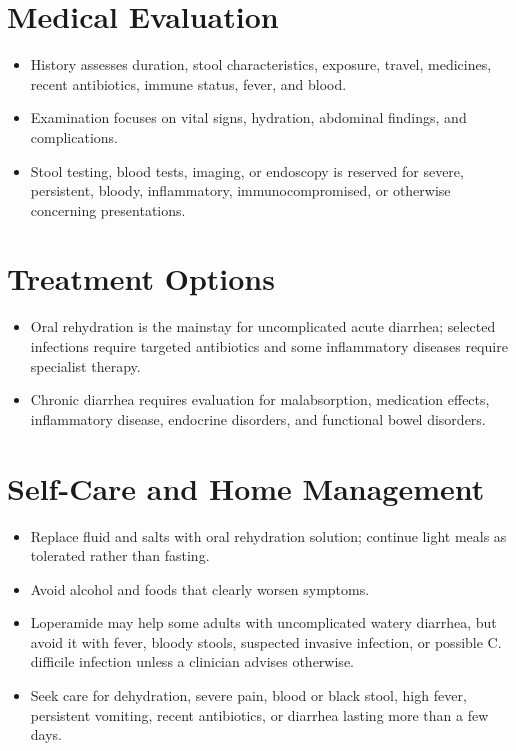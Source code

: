 \section*{Medical Evaluation}
\begin{itemize}
  \item History assesses duration, stool characteristics, exposure, travel, medicines, recent antibiotics, immune status, fever, and blood.
  \item Examination focuses on vital signs, hydration, abdominal findings, and complications.
  \item Stool testing, blood tests, imaging, or endoscopy is reserved for severe, persistent, bloody, inflammatory, immunocompromised, or otherwise concerning presentations.
\end{itemize}

\section*{Treatment Options}
\begin{itemize}
  \item Oral rehydration is the mainstay for uncomplicated acute diarrhea; selected infections require targeted antibiotics and some inflammatory diseases require specialist therapy.
  \item Chronic diarrhea requires evaluation for malabsorption, medication effects, inflammatory disease, endocrine disorders, and functional bowel disorders.
\end{itemize}

\section*{Self-Care and Home Management}
\begin{itemize}
  \item Replace fluid and salts with oral rehydration solution; continue light meals as tolerated rather than fasting.
  \item Avoid alcohol and foods that clearly worsen symptoms.
  \item Loperamide may help some adults with uncomplicated watery diarrhea, but avoid it with fever, bloody stools, suspected invasive infection, or possible C. difficile infection unless a clinician advises otherwise.
  \item Seek care for dehydration, severe pain, blood or black stool, high fever, persistent vomiting, recent antibiotics, or diarrhea lasting more than a few days.
\end{itemize}

